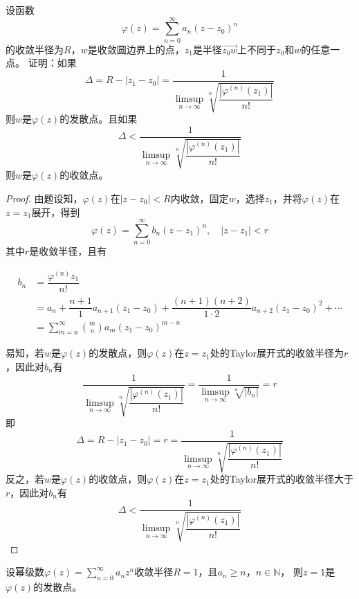 \begin{lemma}\label{lemma:radius}

    设函数
    $$\varphi(z) = \sum\limits_{n = 0}^{\infty}{a_n (z - z_0)^n}$$
    的收敛半径为$R$，$w$是收敛圆边界上的点，$z_1$是半径$\vec{z_0w}$上不同于$z_0$和$w$的任意一点。
    证明：如果
    $$\Delta = R - |z_1 - z_0| = \dfrac{1}{\limsup\limits_{n \to \infty}{\sqrt[n]{\dfrac{|\varphi^{(n)}(z_1)|}{n!}}}}$$
    则$w$是$\varphi(z)$的发散点。且如果
    $$\Delta < \dfrac{1}{\limsup\limits_{n \to \infty}{\sqrt[n]{\dfrac{|\varphi^{(n)}(z_1)|}{n!}}}}$$
    则$w$是$\varphi(z)$的收敛点。

\end{lemma}

\begin{proof}

    由题设知，$\varphi(z)$在$|z - z_0| < R$内收敛，固定$w$，选择$z_1$，并将$\varphi(z)$在$z = z_1$展开，得到
    $$\varphi(z) = \sum\limits_{n = 0}^{\infty}{b_n (z - z_1)^n}, \quad |z - z_1| < r$$
    其中$r$是收敛半径，且有

    \begin{align*}
        b_n & = \dfrac{\varphi^{(n)}{z_1}}{n!} \\
        & = a_n + \dfrac{n + 1}{1}a_{n + 1}(z_1 - z_0) + \dfrac{(n + 1)(n + 2)}{1 \cdot 2}a_{n + 2}(z_1 - z_0)^2 + \cdots \\
        & = \sum\limits_{m = n}^{\infty}{\binom{m}{n}a_m(z_1 - z_0)^{m - n}}
    \end{align*}

    易知，若$w$是$\varphi(z)$的发散点，则$\varphi(z)$在$z = z_1$处的\textup{Taylor}展开式的收敛半径为$r$，因此对$b_n$有
    $$\dfrac{1}{\limsup\limits_{n \to \infty}{\sqrt[n]{\dfrac{|\varphi^{(n)}(z_1)|}{n!}}}} = \dfrac{1}{\limsup\limits_{n \to \infty}{\sqrt[n]{|b_n|}}} = r$$
    即
    $$\Delta = R - |z_1 - z_0| = r = \dfrac{1}{\limsup\limits_{n \to \infty}{\sqrt[n]{\dfrac{|\varphi^{(n)}(z_1)|}{n!}}}}$$
    反之，若$w$是$\varphi(z)$的收敛点，则$\varphi(z)$在$z = z_1$处的\textup{Taylor}展开式的收敛半径大于$r$，因此对$b_n$有
    $$\Delta < \dfrac{1}{\limsup\limits_{n \to \infty}{\sqrt[n]{\dfrac{|\varphi^{(n)}(z_1)|}{n!}}}}$$

\end{proof}

\begin{theorem}[Pringshajm定理]
    
    设幂级数$\varphi(z) = \sum\limits_{n = 0}^{\infty}{a_n z^n}$收敛半径$R = 1$，且$a_n \geq n$，$n \in \mathbb{N}$，
    则$z = 1$是$\varphi(z)$的发散点。

\end{theorem}

